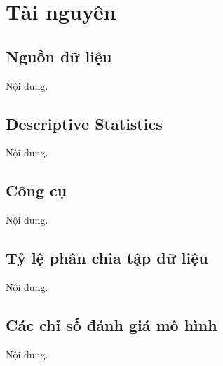 \section{Tài nguyên}
\subsection{Nguồn dữ liệu}
Nội dung.

\subsection{Descriptive Statistics}
Nội dung.

\subsection{Công cụ}
Nội dung.

\subsection{Tỷ lệ phân chia tập dữ liệu}
Nội dung.

\subsection{Các chỉ số đánh giá mô hình}
Nội dung.